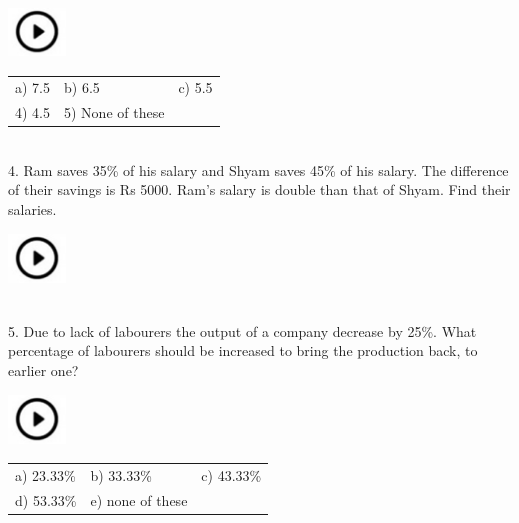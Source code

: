 \documentclass{article}
\begin{document}
\noindent 

\noindent   \includegraphics*[width=0.60in, height=0.52in]{images/image1} 
\begin{tabular}{p{1.7in} p{1.6in} p{1.6in}} \\ 
	 a) 7.5               &      b) 6.5        &     c) 5.5             \\
	4) 4.5        &    5) None of these 	\\
\end{tabular}
                                                            

\noindent 

\noindent \\
 

4.   Ram saves 35\% of his salary and Shyam saves 45\% of his salary. The difference of their  savings  is  Rs  5000.  Ram's  salary  is  double  than  that  of  Shyam.  Find  their  salaries.

\noindent   \includegraphics*[width=0.60in, height=0.52in]{images/image1}   

\noindent 

\noindent 

\noindent 

\noindent 

\noindent \\


5.   Due to lack of labourers the output of a company decrease by 25\%. What percentage of labourers should be increased to bring the production back, to earlier one?

\noindent  \includegraphics*[width=0.60in, height=0.52in]{images/image1}  
\begin{tabular}{p{1.7in} p{1.6in} p{1.6in}} \\ 
 a) 23.33\%              &     b) 33.33\%       &    c) 43.33\%             \\
d) 53.33\%          &  e) none of these 	\\
\end{tabular}  
                                
\end{document}
